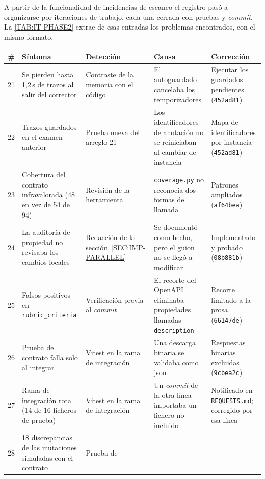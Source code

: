 A partir de la funcionalidad de incidencias de escaneo el registro pasó a
organizarse por iteraciones de trabajo, cada una cerrada con pruebas y
\textit{commit}. La \cref{TAB:IT-PHASE2} extrae de esas entradas los problemas
encontrados, con el mismo formato.

\begin{table}[htbp]
  \centering
  \scriptsize
  \begin{tabular}{rp{}p{}p{}p{}}
    \toprule
    \textbf{\#} & \textbf{Síntoma} & \textbf{Detección} & \textbf{Causa} & \textbf{Corrección} \\
    \midrule
    21 & Se pierden hasta 1,2\,s de trazos al salir del corrector & Contraste de la
      memoria con el código & El autoguardado cancelaba los temporizadores &
      Ejecutar los guardados pendientes (\texttt{452ad81}) \\
    22 & Trazos guardados en el examen anterior & Prueba nueva del arreglo 21 &
      Los identificadores de anotación no se reiniciaban al cambiar de instancia &
      Mapa de identificadores por instancia (\texttt{452ad81}) \\
    23 & Cobertura del contrato infravalorada (48 en vez de 54 de 94) & Revisión de
      la herramienta & \texttt{coverage.py} no reconocía dos formas de llamada &
      Patrones ampliados (\texttt{af64bea}) \\
    24 & La auditoría de propiedad no revisaba los cambios locales & Redacción de la
      sección~\ref{SEC:IMP-PARALLEL} & Se documentó como hecho, pero el guion no se
      llegó a modificar & Implementado y probado (\texttt{08b881b}) \\
    25 & Falsos positivos en \texttt{rubric\_criteria} & Verificación previa al
      \textit{commit} & El recorte del OpenAPI eliminaba propiedades llamadas
      \texttt{description} & Recorte limitado a la prosa (\texttt{66147de}) \\
    26 & Prueba de contrato falla solo al integrar & Vitest en la rama de
      integración & Una descarga binaria se validaba como \acs{json} &
      Respuestas binarias excluidas (\texttt{9cbea2c}) \\
    27 & Rama de integración rota (14 de 16 ficheros de prueba) & Vitest en la rama
      de integración & Un \textit{commit} de la otra línea importaba un fichero no
      incluido & Notificado en \texttt{REQUESTS.md}; corregido por esa línea \\
    28 & 18 discrepancias de las mutaciones simuladas con el contrato & Prueba de

\end{tabular}
\end{table}
